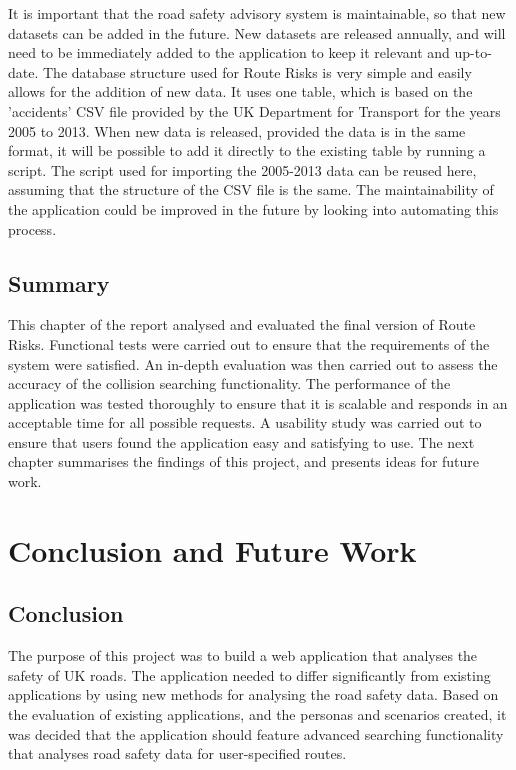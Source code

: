\documentclass[authoryearcitations]{UoYCSproject}
\begin{document}
It is important that the road safety advisory system is maintainable, so that new datasets can be added in the future. New datasets are released annually, and will need to be immediately added to the application to keep it relevant and up-to-date. The database structure used for Route Risks is very simple and easily allows for the addition of new data. It uses one table, which is based on the 'accidents' CSV file provided by the UK Department for Transport for the years 2005 to 2013. When new data is released, provided the data is in the same format, it will be possible to add it directly to the existing table by running a script. The script used for importing the 2005-2013 data can be reused here, assuming that the structure of the CSV file is the same. The maintainability of the application could be improved in the future by looking into automating this process.

\section{Summary}

This chapter of the report analysed and evaluated the final version of Route Risks. Functional tests were carried out to ensure that the requirements of the system were satisfied. An in-depth evaluation was then carried out to assess the accuracy of the collision searching functionality. The performance of the application was tested thoroughly to ensure that it is scalable and responds in an acceptable time for all possible requests. A usability study was carried out to ensure that users found the application easy and satisfying to use. The next chapter summarises the findings of this project, and presents ideas for future work.

\chapter{Conclusion and Future Work}

\section{Conclusion}

The purpose of this project was to build a web application that analyses the safety of UK roads. The application needed to differ significantly from existing applications by using new methods for analysing the road safety data. Based on the evaluation of existing applications, and the personas and scenarios created, it was decided that the application should feature advanced searching functionality that analyses road safety data for user-specified routes. 
\end{document}
